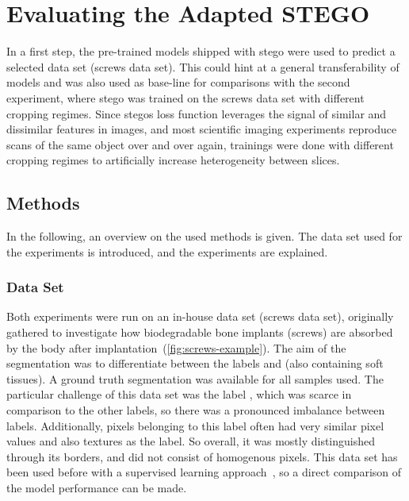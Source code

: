 \section{Evaluating the Adapted STEGO}\label{sec:proof-of-concept}
In a first step, the pre-trained models shipped with \gls{stego} were used to predict a selected data set (screws data set).
This could hint at a general transferability of models and was also used as base-line for comparisons with the second experiment, where \gls{stego} was trained on the screws data set with different cropping regimes.
Since \gls{stego}s loss function leverages the signal of similar and dissimilar features in images, and most scientific imaging experiments reproduce scans of the same object over and over again, trainings were done with different cropping regimes to artificially increase heterogeneity between slices.


\subsection{Methods}
In the following, an overview on the used methods is given.
The data set used for the experiments is introduced, and the experiments are explained.

\subsubsection{Data Set}
Both experiments were run on an in-house data set (screws data set), originally gathered to investigate how biodegradable bone implants (screws) are absorbed by the body after implantation~(\autoref{fig:screws-example}).
The aim of the segmentation was to differentiate between the labels  and  (also containing soft tissues).
A ground truth segmentation was available for all samples used.
The particular challenge of this data set was the label , which was scarce in comparison to the other labels, so there was a pronounced imbalance between labels.
Additionally, pixels belonging to this label often had very similar pixel values and also textures as the  label.
So overall, it was mostly distinguished through its borders, and did not consist of homogenous pixels.
This data set has been used before with a supervised learning approach~\autocite{Baltruschat2021}, so a direct comparison of the model performance can be made.

